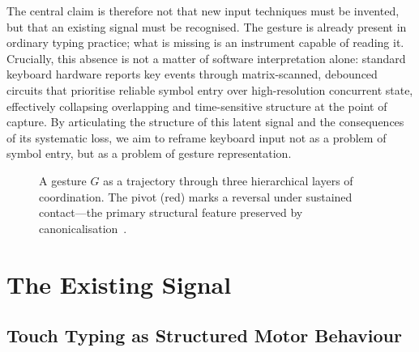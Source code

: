\documentclass[11pt, a4paper]{article}
\begin{document}
The central claim is therefore not that new input techniques must be
invented, but that an existing signal must be recognised. The gesture is
already present in ordinary typing practice; what is missing is an
instrument capable of reading it. Crucially, this absence is not a
matter of software interpretation alone: standard keyboard hardware
reports key events through matrix-scanned, debounced circuits that
prioritise reliable symbol entry over high-resolution concurrent state,
effectively collapsing overlapping and time-sensitive structure at the
point of capture. By articulating the structure of this latent signal and
the consequences of its systematic loss, we aim to reframe keyboard
input not as a problem of symbol entry, but as a problem of gesture
representation.

\begin{figure}[h]
\centering
{}
\caption{A gesture $G$ as a trajectory through three hierarchical layers of
coordination. The pivot (red) marks a reversal under sustained contact---the
primary structural feature preserved by canonicalisation~\cite{cox2016}.}
\label{fig:layers}
\end{figure}

\section{The Existing Signal}

\subsection{Touch Typing as Structured Motor Behaviour}
\end{document}
